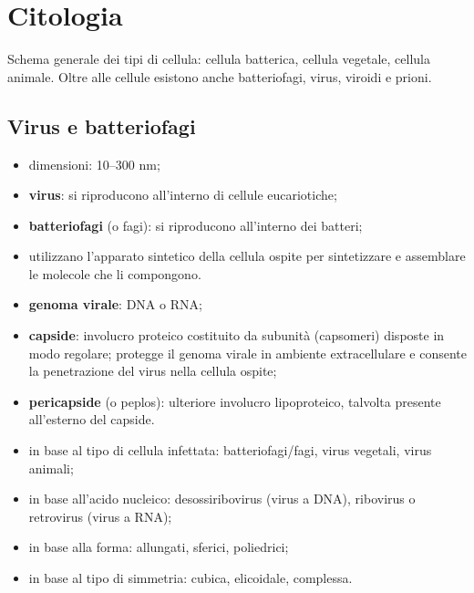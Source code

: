 \section{Citologia}

Schema generale dei tipi di cellula: cellula batterica, cellula vegetale, cellula animale. Oltre alle cellule esistono anche batteriofagi, virus, viroidi e prioni.

\subsection{Virus e batteriofagi}

\begin{itemize}
  \item dimensioni: 10--300 nm;
  \item \textbf{virus}: si riproducono all'interno di cellule eucariotiche;
  \item \textbf{batteriofagi} (o fagi): si riproducono all'interno dei batteri;
  \item utilizzano l'apparato sintetico della cellula ospite per sintetizzare e assemblare le molecole che li compongono.
\end{itemize}

\begin{itemize}
  \item \textbf{genoma virale}: DNA o RNA;
  \item \textbf{capside}: involucro proteico costituito da subunità (capsomeri) disposte in modo regolare; protegge il genoma virale in ambiente extracellulare e consente la penetrazione del virus nella cellula ospite;
  \item \textbf{pericapside} (o peplos): ulteriore involucro lipoproteico, talvolta presente all'esterno del capside.
\end{itemize}

\begin{itemize}
  \item in base al tipo di cellula infettata: batteriofagi/fagi, virus vegetali, virus animali;
  \item in base all'acido nucleico: desossiribovirus (virus a DNA), ribovirus o retrovirus (virus a RNA);
  \item in base alla forma: allungati, sferici, poliedrici;
  \item in base al tipo di simmetria: cubica, elicoidale, complessa.
\end{itemize}


